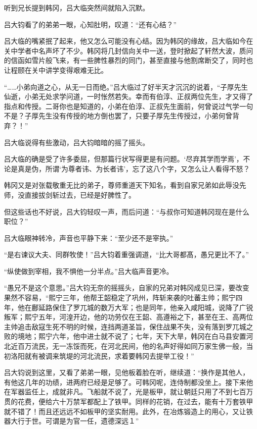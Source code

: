 听到兄长提到韩冈，吕大临突然间就陷入沉默。

吕大钧看了的弟弟一眼，心知肚明，叹道：“还有心结？”

吕大临的嘴紧抿了起来，他又怎么可能没有心结。因为韩冈的缘故，吕大临如今在关中学者中名声坏了不少。韩冈将几封信向关中一送，登时掀起了轩然大波，质问的信函如雪片般飞来，有一些脾性暴烈的同门，甚至直接与他割席断交了，同时也让程颐在关中讲学变得艰难无比。

“……小弟向道之心，从无一日而绝。”吕大临过了好半天才沉沉的说着，“子厚先生仙逝，小弟无处求学问道，一时怅然若失。幸而有伯淳、正叔两位先生，才又得了指点和传授。二哥你也是知道的，小弟在伯淳、正叔先生面前，何曾说过气学一句不是？子厚先生没有传授的地方倒也罢了，只要子厚先生传授过，小弟何曾背弃？！”

吕大临说得有些激动，吕大钧暗暗的摇了摇头。

吕大临的确是受了许多委屈，但那篇行状写得更是有问题。‘尽弃其学而学焉’，不论是真是伪，所谓‘为尊者讳、为长者讳’，忘了这八个字，又怎么让人看得不怒？

韩冈又是对张载敬重无比的弟子，尊师重道天下知名，看到自家兄弟如此辱没先师，没直接拔剑斩过去，已经是好脾性了。

但这些话也不好说，吕大钧轻叹一声，而后问道：“与叔你可知道韩冈现在是什么职位？”

吕大临眼神转冷，声音也平静下来：“至少还不是宰执。”

“是右谏议大夫、同群牧使！”吕大钧着重强调道，“比大哥都髙，愚兄更比不了。”

“纵使做到宰相，我不惧他一分半点。”吕大临声音更冷。

“愚兄不是这个意思。”吕大钧无奈的摇摇头，自家的兄弟对韩冈成见已深，要改变果然不容易，“熙宁三年，他帮王韶稳定了巩州，阵斩来袭的吐蕃主帅；熙宁四年，他在鄜延路保住了罗兀城的数万大军；也是同年，他亲入咸阳城，说降了广锐叛军；熙宁五年，河湟开边，他的功劳仅在王韶、高遵裕之下，甚至在王、高两位主帅追击敌寇生死不明的时候，连挡两道圣旨，保住战果不失，没有落到罗兀城之败的境地；熙宁六年，他中进士就不说了；七年，天下大旱，韩冈在白马县安置河北近百万流民，无一冻馁而死，在河北民间，他的名声好得如同万家生佛一般，当初洛阳就有被调来筑堤的河北流民，求着要韩冈去提举工役！”

吕大钧说到这里，又看了弟弟一眼，见他板着脸在听，继续道：“换作是其他人，有他这几年的功绩，进两府已经是足够了。可韩冈呢，连侍制都没坐上。接下来他在军器监任上，成就非凡。飞船就不说了，光是板甲，就让朝廷只用了不到七百万贯的花费，便给六十万禁军都配上了铁甲。同样的花销，在过去，能有十万套铁甲就不错了！而且还远远不如板甲的坚实耐用。此外，在冶炼锻造上的用心，又让铁器大行于世。可谓是为官一任，遗德深远１”

